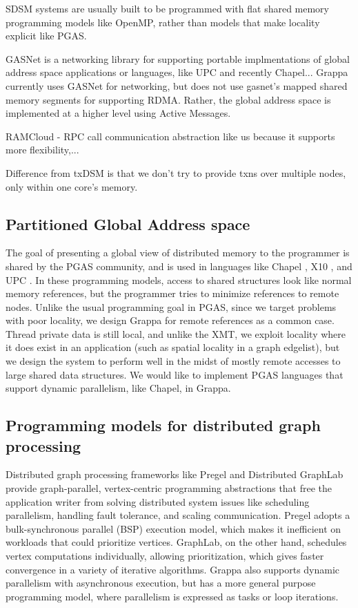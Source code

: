 SDSM systems are usually built to be programmed with flat shared memory programming models like OpenMP, rather than models that make locality explicit like PGAS. 


GASNet is a networking library for supporting portable implmentations of global address space applications or languages, like UPC and recently Chapel...
Grappa currently uses GASNet for networking, but does not use gasnet's mapped shared memory segments for supporting RDMA. Rather, the global address space is implemented at a higher level using Active Messages.

RAMCloud - RPC call communication abstraction like us because it supports more flexibility,...


Difference from txDSM \cite{sdsm-with-txn-coherence} is that we don't try to provide txns over multiple nodes, only within one core's memory.

\subsection{Partitioned Global Address space}
The goal of presenting a global view of distributed memory to the programmer is shared by the PGAS community, and is used in languages like Chapel \cite{Chapel}, X10 \cite{X10}, and UPC \cite{UPC}. In these programming models, access to shared structures look like normal memory references, but the programmer tries to minimize references to remote nodes. Unlike the usual programming goal in PGAS, since we target problems with poor locality, we design Grappa for remote references as a common case. Thread private data is still local, and unlike the XMT, we exploit locality where it does exist in an application (such as spatial locality in a graph edgelist), but we design the system to perform well in the midst of mostly remote accesses to large shared data structures. We would like to implement PGAS languages that support dynamic parallelism, like Chapel, in Grappa.

\subsection{Programming models for distributed graph processing}

Distributed graph processing frameworks like Pregel \cite{pregel:2010} and Distributed GraphLab \cite{distgraphlab:vldb12} provide graph-parallel, vertex-centric programming abstractions that free the application writer from solving distributed system issues like scheduling parallelism, handling fault tolerance, and scaling communication. Pregel adopts a bulk-synchronous parallel (BSP) execution model, which makes it inefficient on workloads that could prioritize vertices. GraphLab, on the other hand, schedules vertex computations individually, allowing prioritization, which gives faster convergence in a variety of iterative algorithms. Grappa also supports dynamic parallelism with asynchronous execution, but has a more general purpose programming model, where parallelism is expressed as tasks or loop iterations. 


